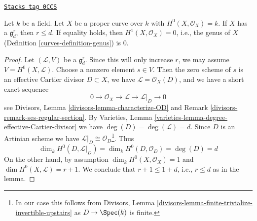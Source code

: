 \begin{lemma}
\label{curves-lemma-grd-inequalities}
\href{https://stacks.math.columbia.edu/tag/0CCS}{\texttt{Stacks tag 0CCS}}

Let $k$ be a field. Let $X$ be a proper curve over $k$ with
$H^0(X, \mathcal{O}_X) = k$. If $X$ has a $\mathfrak g^r_d$, then
$r \leq d$. If equality holds, then $H^1(X, \mathcal{O}_X) = 0$, i.e.,
the genus of $X$ (Definition \ref{curves-definition-genus}) is $0$.
\end{lemma}

\begin{proof}
Let $(\mathcal{L}, V)$ be a $\mathfrak g^r_d$. Since this will only
increase $r$, we may assume $V = H^0(X, \mathcal{L})$. Choose a
nonzero element $s \in V$.  Then the zero scheme of $s$ is an effective Cartier
divisor $D \subset X$, we have $\mathcal{L} = \mathcal{O}_X(D)$, and
we have a short exact sequence
$$
0 \to \mathcal{O}_X \to \mathcal{L} \to \mathcal{L}|_D \to 0
$$
see Divisors, Lemma \ref{divisors-lemma-characterize-OD} and
Remark \ref{divisors-remark-ses-regular-section}.
By Varieties, Lemma \ref{varieties-lemma-degree-effective-Cartier-divisor}
we have $\deg(D) = \deg(\mathcal{L}) = d$.
Since $D$ is an Artinian scheme we have
$\mathcal{L}|_D \cong \mathcal{O}_D$\footnote{In our case this
follows from Divisors, Lemma
\ref{divisors-lemma-finite-trivialize-invertible-upstairs}
as $D \to \Spec(k)$ is finite.}.
Thus
$$
\dim_k H^0(D, \mathcal{L}|_D) = \dim_k H^0(D, \mathcal{O}_D) = \deg(D) = d
$$
On the other hand, by assumption
$\dim_k H^0(X, \mathcal{O}_X) = 1$ and $\dim H^0(X, \mathcal{L}) = r + 1$.
We conclude that $r + 1 \leq 1 + d$, i.e., $r \leq d$ as in the lemma.


\end{proof}
